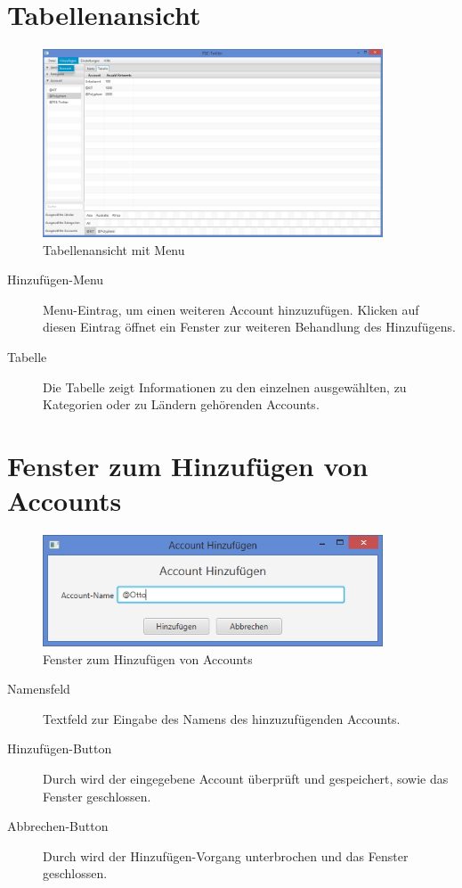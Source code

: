 \section{Tabellenansicht}

\begin{figure}[h]
	\centering
	\includegraphics[width=0.9\textwidth]{img/DemoGUITabelleAddAccount.png}
	\caption{Tabellenansicht mit Menu}
	\label{c:Tabellenansicht mit Menu}
\end{figure}

\begin{description}
	\item[Hinzufügen-Menu] Menu-Eintrag, um einen weiteren Account hinzuzufügen. Klicken auf diesen Eintrag öffnet ein Fenster zur weiteren Behandlung des Hinzufügens.
	\item[Tabelle] Die Tabelle zeigt Informationen zu den einzelnen ausgewählten, zu Kategorien oder zu Ländern gehörenden Accounts.
\end{description}

\section{Fenster zum Hinzufügen von Accounts}

\begin{figure}[h]
	\centering
	\includegraphics[width=0.9\textwidth]{img/DemoGUIAddAccount.png}
	\caption{Fenster zum Hinzufügen von Accounts}
	\label{c:Fenster zum Hinzufügen von Accounts}
\end{figure}

\begin{description}
	\item[Namensfeld] Textfeld zur Eingabe des Namens des hinzuzufügenden Accounts.
	\item[Hinzufügen-Button] Durch wird der eingegebene Account überprüft und gespeichert, sowie das Fenster geschlossen.
	\item[Abbrechen-Button] Durch wird der Hinzufügen-Vorgang unterbrochen und das Fenster geschlossen.
\end{description}
